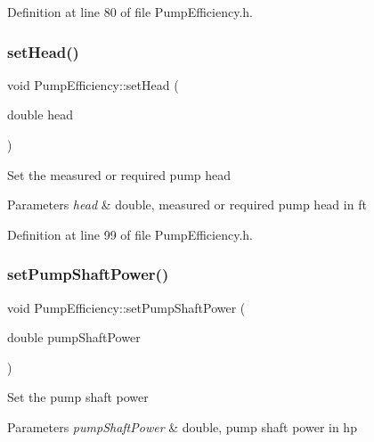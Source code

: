 Definition at line 80 of file Pump\+Efficiency.\+h.

\mbox{\label{class_pump_efficiency_addfa92d7c30598ecedcee8f7c47eed29}} 
\subsubsection{\texorpdfstring{set\+Head()}{setHead()}}
{\footnotesize\ttfamily void Pump\+Efficiency\+::set\+Head (\begin{DoxyParamCaption}\item[{double}]{head }\end{DoxyParamCaption})\hspace{0.3cm}{\ttfamily [inline]}}

Set the measured or required pump head


\begin{DoxyParams}{Parameters}
{\em head} & double, measured or required pump head in ft \\
\hline
\end{DoxyParams}


Definition at line 99 of file Pump\+Efficiency.\+h.

\mbox{\label{class_pump_efficiency_ad3c2e64a590528b54e3878f9d1f3223a}} 
\subsubsection{\texorpdfstring{set\+Pump\+Shaft\+Power()}{setPumpShaftPower()}}
{\footnotesize\ttfamily void Pump\+Efficiency\+::set\+Pump\+Shaft\+Power (\begin{DoxyParamCaption}\item[{double}]{pump\+Shaft\+Power }\end{DoxyParamCaption})\hspace{0.3cm}{\ttfamily [inline]}}

Set the pump shaft power


\begin{DoxyParams}{Parameters}
{\em pump\+Shaft\+Power} & double, pump shaft power in hp \\
\hline
\end{DoxyParams}


